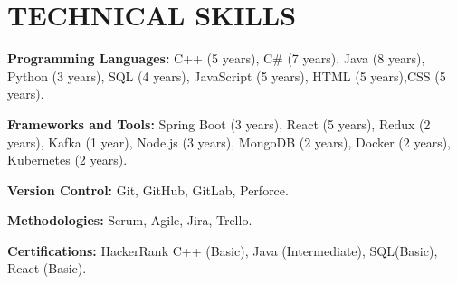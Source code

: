 \documentclass[letterpaper,11pt]{article}
\begin{document}
\section{\color{airforceblue}TECHNICAL SKILLS}
 \begin{itemize}[leftmargin=.25in, label={}]
    \small{\item{
     \textbf{\normalsize{Programming Languages:}}{ \normalsize{ C++ (5 years), C\# (7 years), Java (8 years), Python (3 years), SQL (4 years), JavaScript (5 years), HTML (5 years),CSS (5 years).}} \\
      \vspace{1.2pt}
      
     \textbf{\normalsize{Frameworks and Tools:}}{ \normalsize{Spring Boot (3 years), React (5 years), Redux (2 years), Kafka (1 year), Node.js (3 years), MongoDB (2 years), Docker (2 years), Kubernetes (2 years).}} \\
      \vspace{1.2pt}

      \textbf{\normalsize{Version Control:}}{ \normalsize{Git, GitHub, GitLab, Perforce.}} \\
      \vspace{1.2pt}

      \textbf{\normalsize{Methodologies:}}{ \normalsize{Scrum, Agile, Jira, Trello.}} \\
      \vspace{1.2pt}
      
     \textbf{\normalsize{Certifications:}}{ \normalsize{HackerRank C++ (Basic), Java (Intermediate), SQL(Basic), React (Basic).}}

     }}
 \end{itemize}
 \vspace{-16pt}
 
\end{document}
